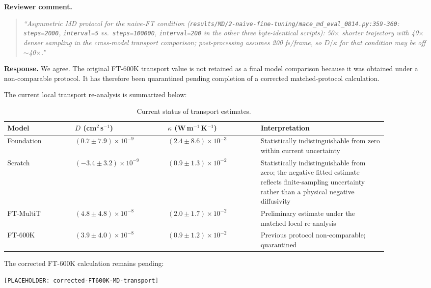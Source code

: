 \documentclass[11pt,a4paper]{article}
\begin{document}
\noindent\textbf{Reviewer comment.}
\begin{quote}
\itshape
``Asymmetric MD protocol for the naive-FT condition (\texttt{results/MD/2-naive-fine-tuning/mace\_md\_eval\_0814.py:359-360}: \texttt{steps=2000}, \texttt{interval=5} vs.\ \texttt{steps=100000}, \texttt{interval=200} in the other three byte-identical scripts): 50$\times$ shorter trajectory with 40$\times$ denser sampling in the cross-model transport comparison; post-processing assumes 200 fs/frame, so $D/\kappa$ for that condition may be off $\sim$40$\times$.''
\end{quote}

\noindent\textbf{Response.}
We agree. The original FT-600K transport value is not retained as a final model comparison because it was obtained under a non-comparable protocol. It has therefore been quarantined pending completion of a corrected matched-protocol calculation.

The current local transport re-analysis is summarized below:

\begin{table}[h]
\centering
\caption{Current status of transport estimates.}
\begin{tabular}{p{0.16\linewidth}p{0.22\linewidth}p{0.22\linewidth}p{0.30\linewidth}}
\toprule
Model & $D$ (cm$^2$\,s$^{-1}$) & $\kappa$ (W\,m$^{-1}$\,K$^{-1}$) & Interpretation \\
\midrule
Foundation &
$(0.7 \pm 7.9)\times10^{-9}$ &
$(2.4 \pm 8.6)\times10^{-3}$ &
Statistically indistinguishable from zero within current uncertainty \\
Scratch &
$(-3.4 \pm 3.2)\times10^{-9}$ &
$(0.9 \pm 1.3)\times10^{-2}$ &
Statistically indistinguishable from zero; the negative fitted estimate reflects finite-sampling uncertainty rather than a physical negative diffusivity \\
FT-MultiT &
$(4.8 \pm 4.8)\times10^{-8}$ &
$(2.0 \pm 1.7)\times10^{-2}$ &
Preliminary estimate under the matched local re-analysis \\
FT-600K &
$(3.9 \pm 4.0)\times10^{-8}$ &
$(0.9 \pm 1.2)\times10^{-2}$ &
Previous protocol non-comparable; quarantined \\
\bottomrule
\end{tabular}
\end{table}

The corrected FT-600K calculation remains pending:

\begin{center}
\texttt{[PLACEHOLDER: corrected-FT600K-MD-transport]}
\end{center}
\end{document}

